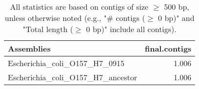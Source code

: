\documentclass[12pt,a4paper]{article}
\begin{document}
\begin{table}[ht]
\begin{center}
\caption{All statistics are based on contigs of size $\geq$ 500 bp, unless otherwise noted (e.g., "\# contigs ($\geq$ 0 bp)" and "Total length ($\geq$ 0 bp)" include all contigs).}
\begin{tabular}{|l*{1}{|r}|}
\hline
Assemblies & final.contigs \\ \hline
Escherichia\_coli\_O157\_H7\_0915 & 1.006 \\ \hline
Escherichia\_coli\_O157\_H7\_ancestor & 1.006 \\ \hline
\end{tabular}
\end{center}
\end{table}
\end{document}

